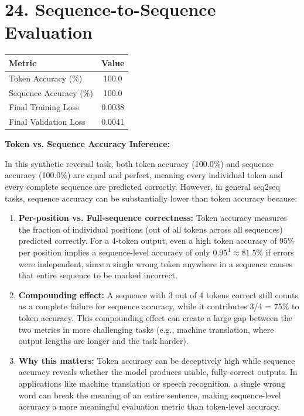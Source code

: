 \documentclass[10pt]{article}
\begin{document}
\section*{24. Sequence-to-Sequence Evaluation}

\begin{center}
\begin{tabular}{|l|c|}
\hline
\textbf{Metric} & \textbf{Value}\\
\hline
Token Accuracy (\%) & 100.0\\
Sequence Accuracy (\%) & 100.0\\
Final Training Loss & 0.0038\\
Final Validation Loss & 0.0041\\
\hline
\end{tabular}
\end{center}

\textbf{Token vs. Sequence Accuracy Inference:}

In this synthetic reversal task, both token accuracy (100.0\%) and sequence accuracy (100.0\%) are equal 
and perfect, meaning every individual token and every complete sequence are predicted correctly. However, 
in general seq2seq tasks, sequence accuracy can be substantially lower than token accuracy because:

\begin{enumerate}
\item \textbf{Per-position vs. Full-sequence correctness:} Token accuracy measures the fraction of 
individual positions (out of all tokens across all sequences) predicted correctly. For a 4-token output, 
even a high token accuracy of 95\% per position implies a sequence-level accuracy of only $0.95^4 \approx 81.5\%$ 
if errors were independent, since a single wrong token anywhere in a sequence causes that entire sequence 
to be marked incorrect.

\item \textbf{Compounding effect:} A sequence with 3 out of 4 tokens correct still counts as a complete 
failure for sequence accuracy, while it contributes 3/4 = 75\% to token accuracy. This compounding effect 
can create a large gap between the two metrics in more challenging tasks (e.g., machine translation, where 
output lengths are longer and the task harder).

\item \textbf{Why this matters:} Token accuracy can be deceptively high while sequence accuracy reveals 
whether the model produces usable, fully-correct outputs. In applications like machine translation or 
speech recognition, a single wrong word can break the meaning of an entire sentence, making sequence-level 
accuracy a more meaningful evaluation metric than token-level accuracy.
\end{enumerate}
\end{document}
